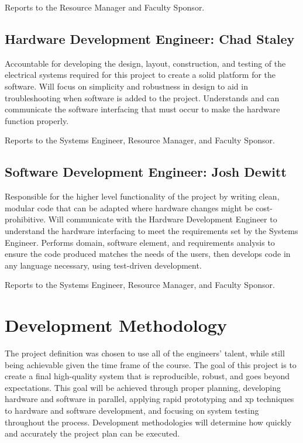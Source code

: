 Reports to the Resource Manager and Faculty Sponsor.

\subsection{Hardware Development Engineer: Chad Staley}
Accountable for developing the design, layout, construction, and testing of the electrical systems required for this project to create a solid platform for the software.
Will focus on simplicity and robustness in design to aid in troubleshooting when software is added to the project.
Understands and can communicate the software interfacing that must occur to make the hardware function properly.

Reports to the Systems Engineer, Resource Manager, and Faculty Sponsor. 

\subsection{Software Development Engineer: Josh Dewitt}
Responsible for the higher level functionality of the project by writing clean, modular code that can be adapted where hardware changes might be cost-prohibitive.
Will communicate with the Hardware Development Engineer to understand the hardware interfacing to meet the requirements set by the Systems Engineer.
Performs domain, software element, and requirements analysis to ensure the code produced matches the needs of the users, then develops code in any language necessary, using test­-driven development.

Reports to the Systems Engineer, Resource Manager, and Faculty Sponsor.

\section{Development Methodology}
The project definition was chosen to use all of the engineers' talent, while still being achievable given the time frame of the course.
The goal of this project is to create a final high-quality system that is reproducible, robust, and goes beyond expectations.
This goal will be achieved through proper planning, developing hardware and software in parallel, applying rapid prototyping and \gls{xp} techniques to hardware and software development, and focusing on system testing throughout the process.
Development methodologies will determine how quickly and accurately the project plan can be executed. 

